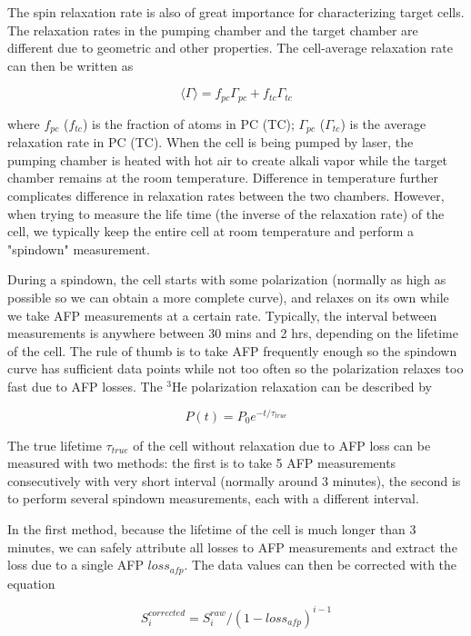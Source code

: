 The spin relaxation rate is also of great importance for characterizing target cells. The relaxation rates in the pumping chamber and the target chamber are different due to geometric and other properties. The cell-average relaxation rate can then be written as

\begin{equation}
\langle \Gamma \rangle=f_{pc}\Gamma_{pc}+f_{tc}\Gamma_{tc}
\end{equation}

where $f_{pc}$ ($f_{tc}$) is the fraction of atoms in PC (TC); $\Gamma_{pc}$ ($\Gamma_{tc}$) is the average relaxation rate in PC (TC). When the cell is being pumped by laser, the pumping chamber is heated with hot air to create alkali vapor while the target chamber remains at the room temperature. Difference in temperature further complicates difference in relaxation rates between the two chambers. However, when trying to measure the life time (the inverse of the relaxation rate) of the cell, we typically keep the entire cell at room temperature and perform a "spindown" measurement. 

During a spindown, the cell starts with some polarization (normally as high as possible so we can obtain a more complete curve), and relaxes on its own while we take AFP measurements at a certain rate. Typically, the interval between measurements is anywhere between 30 mins and 2 hrs, depending on the lifetime of the cell. The rule of thumb is to take AFP frequently enough so the spindown curve has sufficient data points while not too often so the polarization relaxes too fast due to AFP losses. The $^{3}$He polarization relaxation can be described by

\begin{equation}\label{Spindown}
P(t)=P_{0}e^{-t/\tau_{true}}
\end{equation}

The true lifetime $\tau_{true}$ of the cell without relaxation due to AFP loss can be measured with two methods: the first is to take 5 AFP measurements consecutively with very short interval (normally around 3 minutes), the second is to perform several spindown measurements, each with a different interval. 

In the first method, because the lifetime of the cell is much longer than 3 minutes, we can safely attribute all losses to AFP measurements and extract the loss due to a single AFP $loss_{afp}$. The data values can then be corrected with the equation

\begin{equation}
S_{i}^{corrected}=S_{i}^{raw}/(1-loss_{afp})^{i-1}
\end{equation}


